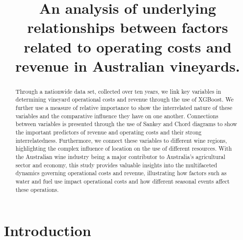 \documentclass[review,12pt,authoryear]{elsarticle}
\begin{document}
\begin{linenumbers}
\begin{frontmatter}

\title{An analysis of underlying relationships between factors related to operating costs and revenue in Australian vineyards.}

\begin{abstract}

Through a nationwide data set, collected over ten years, we link key variables in determining vineyard operational costs and revenue through the use of XGBoost. We further use a measure of relative importance to show the interrelated nature of these variables and the comparative influence they have on one another. Connections between variables is presented through the use of Sankey and Chord diagrams to show the important predictors of revenue and operating costs and their strong interrelatedness. Furthermore, we connect these variables to different wine regions, highlighting the complex influence of location on the use of different resources. With the Australian wine industry being a major contributor to Australia's agricultural sector and economy, this study provides valuable insights into the multifaceted dynamics governing operational costs and revenue, illustrating how factors such as water and fuel use impact operational costs and how different seasonal events affect these operations. 

\end{abstract}

\end{frontmatter}

\section{Introduction}


\end{linenumbers}
\end{document}
